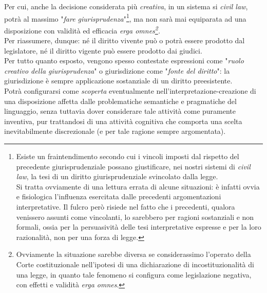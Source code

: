 Per cui, anche la decisione considerata più \textit{creativa}, in un sistema si \textit{civil law}, potrà al massimo "\textit{fare giurisprudenza}"\footnote{Esiste un fraintendimento secondo cui i vincoli imposti dal rispetto del precedente giurisprudenziale possano giustificare, nei nostri sistemi di \textit{civil law}, la tesi di un diritto giurisprudenziale svincolato dalla legge.
\\Si tratta ovviamente di una lettura errata di alcune situazioni: è infatti ovvia e fisiologica l'influenza esercitata dalle precedenti argomentazioni interpretative.
Il fulcro però risiede nel fatto che i precedenti, qualora venissero assunti come vincolanti, lo sarebbero per ragioni sostanziali e non formali, ossia per la persuasività delle tesi interpretative espresse e per la loro razionalità, non per una forza di legge.}, ma non sarà mai equiparata ad una disposizione con validità ed efficacia \textit{erga omnes\footnote{Ovviamente la situazione sarebbe diversa se considerassimo l'operato della Corte costituzionale nell'ipotesi di una dichiarazione di incostituzionalità di una legge, in quanto tale fenomeno si configura come legislazione negativa, con effetti e validità \textit{erga omnes}.}.}
\\Per riassumere, dunque: né il diritto vivente può o potrà essere prodotto dal legislatore, né il diritto vigente può essere prodotto dai giudici.
\\Per tutto quanto esposto, vengono spesso contestate espressioni come "\textit{ruolo creativo della giurisprudenza}" o giurisdizione come "\textit{fonte del diritto}": la giurisdizione è sempre applicazione sostanziale di un diritto preesistente.
\\Potrà configurarsi come \textit{scoperta} eventualmente nell'interpretazione-creazione di una disposizione affetta dalle problematiche semantiche e pragmatiche del linguaggio, senza tuttavia dover considerare tale attività come puramente inventiva, pur trattandosi di una attività cognitiva che comporta una scelta inevitabilmente discrezionale (e per tale ragione sempre argomentata).

